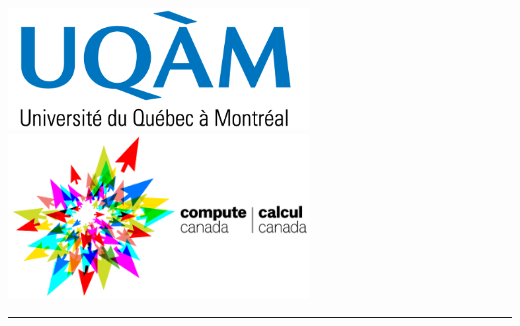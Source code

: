 \documentclass[a0b,landscape]{a0poster}
\begin{document}
\begin{minipage}[b]{\linewidth}
\begin{minipage}[c]{0.25\linewidth}
  \includegraphics[width=8cm,align=c]{logo_uqam.png} \includegraphics[width=8cm,align=c]{compute_canada_transparent_small}  %
\end{minipage}
%
\rule{\linewidth}{3pt}
\end{minipage}
%


\end{document}
